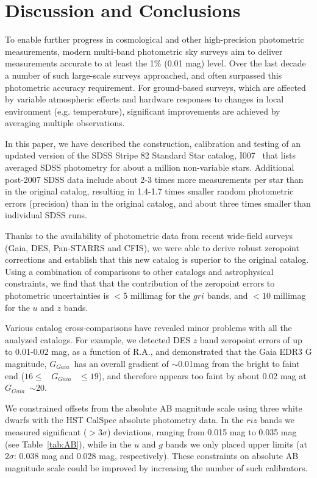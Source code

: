\documentclass[fleqn,usenatbib]{mnras}
\newcommand{\pO}{\hbox{I007}}
\newcommand{\GG}{\hbox{$G_{Gaia}$}}
\begin{document}
\section{Discussion and Conclusions} \label{sec:disc}

To enable further progress in cosmological and other high-precision photometric measurements, 
modern multi-band photometric sky surveys aim to deliver measurements accurate to at least the 1\% 
(0.01 mag) level. Over the last decade a number of such large-scale surveys approached, and
often surpassed this photometric accuracy requirement. For ground-based surveys, which are 
affected by variable atmospheric effects and hardware responses to changes in local environment
(e.g. temperature), significant improvements are achieved by averaging multiple observations. 

In this paper, we have described the construction, calibration and testing of an updated version of the
SDSS Stripe 82 Standard Star catalog, \pO\  \citep{Ivez07} that lists averaged SDSS photometry for about
a million non-variable stars. Additional post-2007 SDSS data include about 
2-3 times more measurements per star than in the original catalog, resulting in 1.4-1.7 times smaller 
random photometric errors (precision) than in the original catalog, and about three times smaller than individual SDSS runs.

Thanks to the availability of photometric data from recent wide-field surveys (Gaia, DES, Pan-STARRS
and CFIS), we were able to derive robust zeropoint corrections and establish that this new catalog
is superior to the original catalog. Using a combination of comparisons to other catalogs and 
astrophysical constraints, we find that that the contribution of the zeropoint errors to photometric
uncertainties is $<5$ millimag for the $gri$ bands, and $<10$ millimag for the $u$ and $z$ bands. 

Various catalog cross-comparisons have revealed minor problems with all the analyzed catalogs.
For example, we detected DES $z$ band zeropoint errors of up to 0.01-0.02 mag, as a function 
of R.A., and demonstrated that the Gaia EDR3 G magnitude, \GG\ has an overall gradient of $\sim$0.01mag from the bright to faint end ($ 16 \leq$ ~\GG~ $\leq 19$), and therefore appears too faint by about 0.02 mag at \GG~$\sim$20.
 
We constrained offsets from the absolute AB magnitude scale using three white dwarfs with the 
HST CalSpec absolute photometry data. In the $riz$ bands we measured significant ($>3\sigma$) 
deviations, ranging from 0.015 mag to 0.035 mag (see Table~\ref{tab:AB}), while in the $u$ and $g$ 
bands we only placed upper limits (at $2\sigma$: 0.038 mag and 0.028 mag, respectively). These
constraints on absolute AB magnitude scale could be improved by increasing the number of such 
calibrators.
\end{document}
